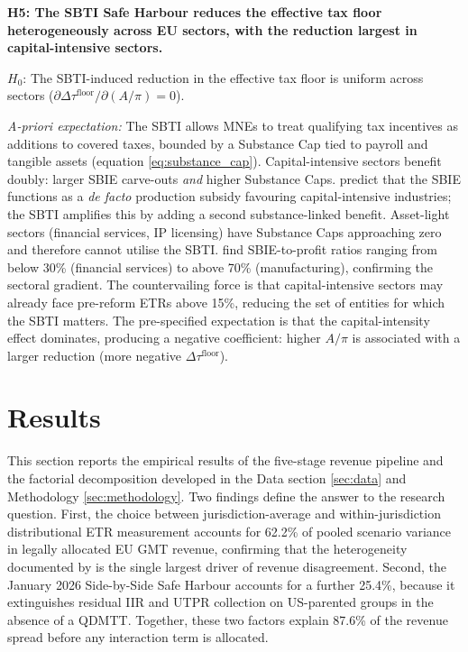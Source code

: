 \documentclass[11pt,a4paper]{article}
\begin{document}
\textbf{H5: The SBTI Safe Harbour reduces the effective tax floor heterogeneously across EU sectors, with the reduction largest in capital-intensive sectors.}

$H_0$: The SBTI-induced reduction in the effective tax floor is uniform across sectors ($\partial \Delta\tau^{\text{floor}} / \partial (A/\pi) = 0$).

\textit{A-priori expectation:} The SBTI allows MNEs to treat qualifying tax incentives as additions to covered taxes, bounded by a Substance Cap tied to payroll and tangible assets (equation \ref{eq:substance_cap}). Capital-intensive sectors benefit doubly: larger SBIE carve-outs \emph{and} higher Substance Caps. \citet{schjelderup2024} predict that the SBIE functions as a \emph{de facto} production subsidy favouring capital-intensive industries; the SBTI amplifies this by adding a second substance-linked benefit. Asset-light sectors (financial services, IP licensing) have Substance Caps approaching zero and therefore cannot utilise the SBTI. \citet{devereux2023} find SBIE-to-profit ratios ranging from below 30\% (financial services) to above 70\% (manufacturing), confirming the sectoral gradient. The countervailing force is that capital-intensive sectors may already face pre-reform ETRs above 15\%, reducing the set of entities for which the SBTI matters. The pre-specified expectation is that the capital-intensity effect dominates, producing a negative coefficient: higher $A/\pi$ is associated with a larger reduction (more negative $\Delta\tau^{\text{floor}}$).

\newpage

\section{Results}\label{sec:results}\label{sec:se_results}

This section reports the empirical results of the five-stage revenue pipeline and the factorial decomposition developed in the Data section \ref{sec:data} and Methodology \ref{sec:methodology}. Two findings define the answer to the research question. First, the choice between jurisdiction-average and within-jurisdiction distributional ETR measurement accounts for 62.2\% of pooled scenario variance in legally allocated EU GMT revenue, confirming that the heterogeneity documented by \citet{hugger2026} is the single largest driver of revenue disagreement. Second, the January 2026 Side-by-Side Safe Harbour accounts for a further 25.4\%, because it extinguishes residual IIR and UTPR collection on US-parented groups in the absence of a QDMTT. Together, these two factors explain 87.6\% of the revenue spread before any interaction term is allocated.
\end{document}
